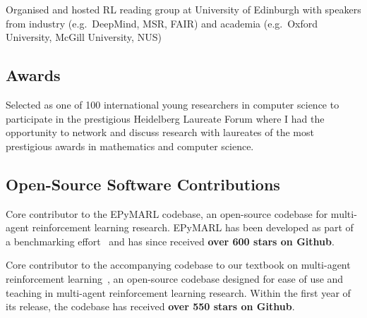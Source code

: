 \documentclass[a4paper,12pt]{article}
\begin{document}
\begin{expblock}
    Organised and hosted RL reading group at University of Edinburgh with speakers from industry (e.g.\ DeepMind, MSR, FAIR) and academia (e.g.\ Oxford University, McGill University, NUS)
\end{expblock}

\subsection{Awards}
\begin{expblock}
    Selected as one of 100 international young researchers in computer science to participate in the prestigious Heidelberg Laureate Forum where I had the opportunity to network and discuss research with laureates of the most prestigious awards in mathematics and computer science.%
\end{expblock}

\subsection{Open-Source Software Contributions}
\begin{expblock}
    Core contributor to the EPyMARL codebase, an open-source codebase for multi-agent reinforcement learning research. EPyMARL has been developed as part of a benchmarking effort~\cite{papoudakis2021benchmarking} and has since received \textbf{over 600 stars on Github}.
\end{expblock}

\begin{expblock}
    Core contributor to the accompanying codebase to our textbook on multi-agent reinforcement learning~\cite{albrecht2024multi}, an open-source codebase designed for ease of use and teaching in multi-agent reinforcement learning research. Within the first year of its release, the codebase has received \textbf{over 550 stars on Github}.
\end{expblock}

\end{document}
